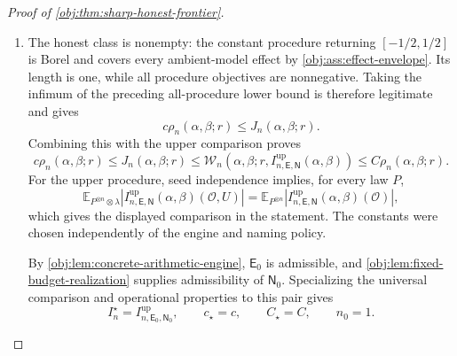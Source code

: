\documentclass[11pt]{article}
\begin{document}
\begin{proof}[Proof of \cref{obj:thm:sharp-honest-frontier}]
\begin{enumerate}
For the radius bound, \(r>0\) is covered above. At \(r=0\), nonnegativity of
interval length gives
\[
c_{\mathrm{radius}}\,0\,n^{-\mathsf b(\beta)}
=0\le\mathcal W_n(\alpha,\beta;0,I).
\]
Thus
\[
c_{\mathrm{radius}}r n^{-\mathsf b(\beta)}
\le\mathcal W_n(\alpha,\beta;r,I)
\qquad(0\le r\le1/2).
\]

Each summand of \(\rho_n\) is nonnegative. Reducing both coefficients to
their minimum and adding the two lower inequalities yields
\[
\begin{aligned}
c\rho_n(\alpha,\beta;r)
&=
\frac{\min\{c_{\mathrm{numerator}},c_{\mathrm{radius}}\}}2
\left[n^{-\mathsf a(\alpha,\beta)}
+r n^{-\mathsf b(\beta)}\right]\\
&\le
\frac12\left[
\mathcal W_n(\alpha,\beta;r,I)
+\mathcal W_n(\alpha,\beta;r,I)
\right]\\
&=\mathcal W_n(\alpha,\beta;r,I).
\end{aligned}
\]
This is the asserted converse for every honest procedure, including
independently randomized procedures.

\item The honest class is nonempty: the constant procedure returning
\([-1/2,1/2]\) is Borel and covers every ambient-model effect by
\cref{obj:ass:effect-envelope}. Its length is one, while all procedure
objectives are nonnegative. Taking the infimum of the preceding
all-procedure lower bound is therefore legitimate and gives
\[
c\rho_n(\alpha,\beta;r)\le J_n(\alpha,\beta;r).
\]
Combining this with the upper comparison proves
\[
c\rho_n(\alpha,\beta;r)
\le J_n(\alpha,\beta;r)
\le
\mathcal W_n\!\left(
\alpha,\beta;r,I^{\mathrm{up}}_{n,\mathsf E,\mathsf N}(\alpha,\beta)
\right)
\le C\rho_n(\alpha,\beta;r).
\]
For the upper procedure, seed independence implies, for every law \(P\),
\[
\mathbb E_{P^{\otimes n}\otimes\lambda}
\left|I^{\mathrm{up}}_{n,\mathsf E,\mathsf N}(\alpha,\beta)(\mathcal O,U)\right|
=
\mathbb E_{P^{\otimes n}}
\left|I^{\mathrm{up}}_{n,\mathsf E,\mathsf N}(\alpha,\beta)(\mathcal O)\right|,
\]
which gives the displayed comparison in the statement. The constants were
chosen independently of the engine and naming policy.

By \cref{obj:lem:concrete-arithmetic-engine},
\(\mathsf E_0\) is admissible, and
\cref{obj:lem:fixed-budget-realization} supplies admissibility of
\(\mathsf N_0\). Specializing the universal comparison and operational
properties to this pair gives
\[
I_n^\star=I^{\mathrm{up}}_{n,\mathsf E_0,\mathsf N_0},
\qquad c_\star=c,\qquad C_\star=C,\qquad n_0=1.
\]


\end{enumerate}
\end{proof}
\end{document}
